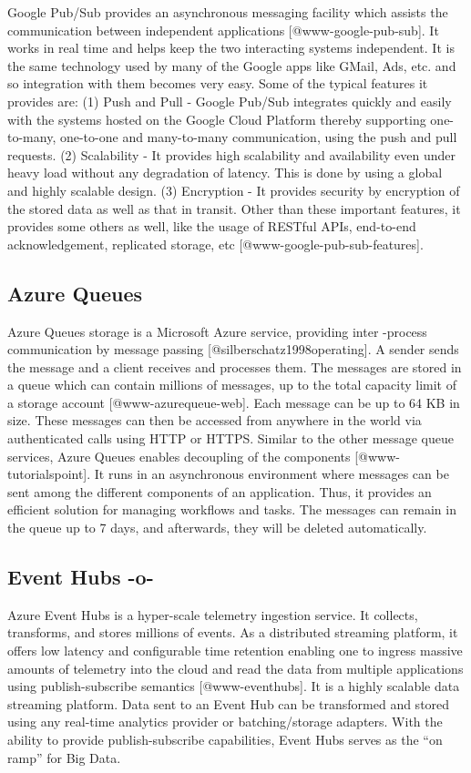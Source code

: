 Google Pub/Sub provides an asynchronous messaging facility which
assists the communication between independent applications
 [@www-google-pub-sub]. It works in real time and helps keep the
two interacting systems independent. It is the same technology used by
many of the Google apps like GMail, Ads, etc. and so integration with
them becomes very easy.  Some of the typical features it provides are:
(1) Push and Pull - Google Pub/Sub integrates quickly and easily with
the systems hosted on the Google Cloud Platform thereby supporting
one-to-many, one-to-one and many-to-many communication, using the push
and pull requests. (2) Scalability - It provides high scalability and
availability even under heavy load without any degradation of
latency. This is done by using a global and highly scalable
design. (3) Encryption - It provides security by encryption of the
stored data as well as that in transit. Other than these important
features, it provides some others as well, like the usage of RESTful
APIs, end-to-end acknowledgement, replicated storage,
etc [@www-google-pub-sub-features].
     
\subsection{Azure Queues}

Azure Queues storage is a Microsoft Azure service, providing inter
-process communication by message
passing [@silberschatz1998operating].  A sender sends the message
and a client receives and processes them.  The messages are stored in
a queue which can contain millions of messages, up to the total
capacity limit of a storage account [@www-azurequeue-web].  Each
message can be up to 64 KB in size. These messages can then be
accessed from anywhere in the world via authenticated calls using HTTP
or HTTPS. Similar to the other message queue services, Azure Queues
enables decoupling of the components [@www-tutorialspoint]. It
runs in an asynchronous environment where messages can be sent among
the different components of an application. Thus, it provides an
efficient solution for managing workflows and tasks. The messages can
remain in the queue up to 7 days, and afterwards, they will be deleted
automatically.

\subsection{Event Hubs -o-}

Azure Event Hubs is a hyper-scale telemetry ingestion service. It
collects, transforms, and stores millions of events. As a distributed
streaming platform, it offers low latency and configurable time
retention enabling one to ingress massive amounts of telemetry into
the cloud and read the data from multiple applications using
publish-subscribe semantics [@www-eventhubs]. It is a highly
scalable data streaming platform. Data sent to an Event Hub can be
transformed and stored using any real-time analytics provider or
batching/storage adapters. With the ability to provide
publish-subscribe capabilities, Event Hubs serves as the ``on ramp''
for Big Data.



